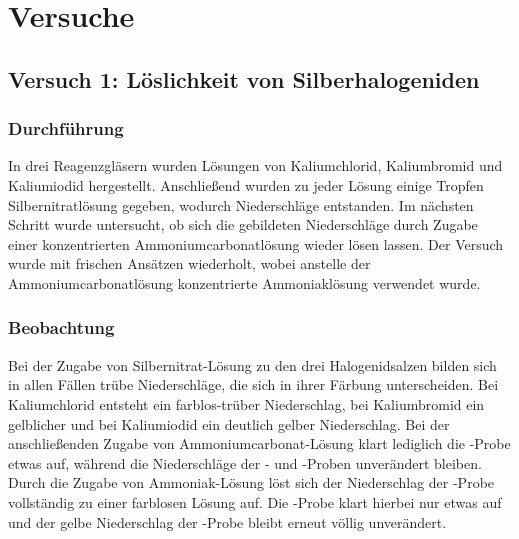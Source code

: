 \section{Versuche}

\subsection{Versuch 1: Löslichkeit von Silberhalogeniden}

\subsubsection{Durchführung}
In drei Reagenzgläsern wurden Lösungen von Kaliumchlorid, Kaliumbromid und Kaliumiodid hergestellt. Anschließend wurden zu jeder Lösung einige Tropfen Silbernitratlösung gegeben, wodurch Niederschläge entstanden. Im nächsten Schritt wurde untersucht, ob sich die gebildeten Niederschläge durch Zugabe einer konzentrierten Ammoniumcarbonatlösung wieder lösen lassen. Der Versuch wurde mit frischen Ansätzen wiederholt, wobei anstelle der Ammoniumcarbonatlösung konzentrierte Ammoniaklösung verwendet wurde. \cite{skript}

\subsubsection{Beobachtung}
%
%
Bei der Zugabe von Silbernitrat-Lösung zu den drei Halogenidsalzen bilden sich in allen Fällen trübe Niederschläge, die sich in ihrer Färbung unterscheiden. Bei Kaliumchlorid entsteht ein farblos-trüber Niederschlag, bei Kaliumbromid ein gelblicher und bei Kaliumiodid ein deutlich gelber Niederschlag. Bei der anschließenden Zugabe von Ammoniumcarbonat-Lösung klart lediglich die -Probe etwas auf, während die Niederschläge der - und -Proben unverändert bleiben. Durch die Zugabe von Ammoniak-Lösung löst sich der Niederschlag der -Probe vollständig zu einer farblosen Lösung auf. Die -Probe klart hierbei nur etwas auf und der gelbe Niederschlag der -Probe bleibt erneut völlig unverändert.

